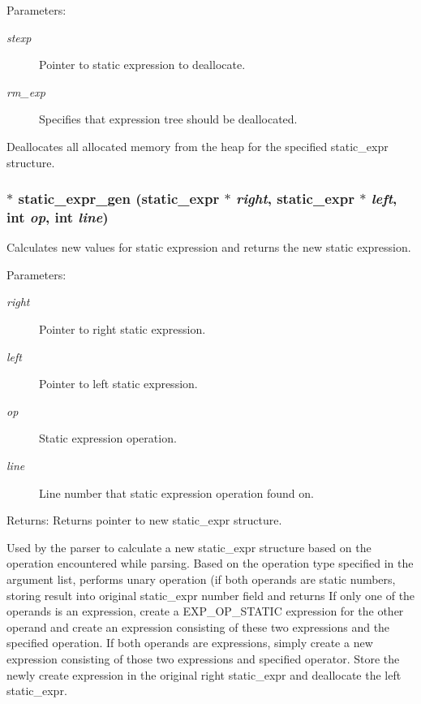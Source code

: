 \begin{Desc}
\item[Parameters:]
\begin{description}
\item[{\em stexp}]Pointer to static expression to deallocate. \item[{\em rm\_\-exp}]Specifies that expression tree should be deallocated.\end{description}
\end{Desc}
Deallocates all allocated memory from the heap for the specified static\_\-expr structure. 
\subsubsection{$\ast$ static\_\-expr\_\-gen ({\bf static\_\-expr} $\ast$ {\em right}, {\bf static\_\-expr} $\ast$ {\em left}, int {\em op}, int {\em line})}\label{static_8c_a1}


Calculates new values for static expression and returns the new static expression.

\begin{Desc}
\item[Parameters:]
\begin{description}
\item[{\em right}]Pointer to right static expression. \item[{\em left}]Pointer to left static expression. \item[{\em op}]Static expression operation. \item[{\em line}]Line number that static expression operation found on.\end{description}
\end{Desc}
\begin{Desc}
\item[Returns:]Returns pointer to new static\_\-expr structure.\end{Desc}
Used by the parser to calculate a new static\_\-expr structure based on the operation encountered while parsing. Based on the operation type specified in the argument list, performs unary operation (if both operands are static numbers, storing result into original static\_\-expr number field and returns If only one of the operands is an expression, create a EXP\_\-OP\_\-STATIC expression for the other operand and create an expression consisting of these two expressions and the specified operation. If both operands are expressions, simply create a new expression consisting of those two expressions and specified operator. Store the newly create expression in the original right static\_\-expr and deallocate the left static\_\-expr. 
